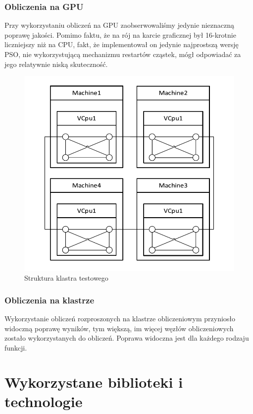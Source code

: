 \documentclass[12pt, twoside, openany, abstract=on]{report}
\theoremstyle{definition}
\begin{document}
\subsection{Obliczenia na GPU}
Przy wykorzystaniu obliczeń na GPU zaobserwowaliśmy jedynie nieznaczną poprawę jakości. Pomimo faktu, że na rój na karcie graficznej był 16-krotnie liczniejszy niż na CPU, fakt, że implementował on jedynie najprostszą wersję PSO, nie wykorzystującą mechanizmu restartów cząstek, mógł odpowiadać za jego relatywnie niską skuteczność. 

\begin{figure}[H]
    \centering
 \includegraphics[width=1\textwidth,natwidth=610,natheight=642]{klasterBbobNoGPU.pdf}
 \caption{Struktura klastra testowego}
\end{figure}
\subsection{Obliczenia na klastrze}
Wykorzystanie obliczeń rozproszonych na klastrze obliczeniowym przyniosło widoczną poprawę wyników, tym większą, im więcej węzłów obliczeniowych zostało wykorzystanych do obliczeń. Poprawa widoczna jest dla każdego rodzaju funkcji.


\chapter{Wykorzystane biblioteki i technologie}
\end{document}
